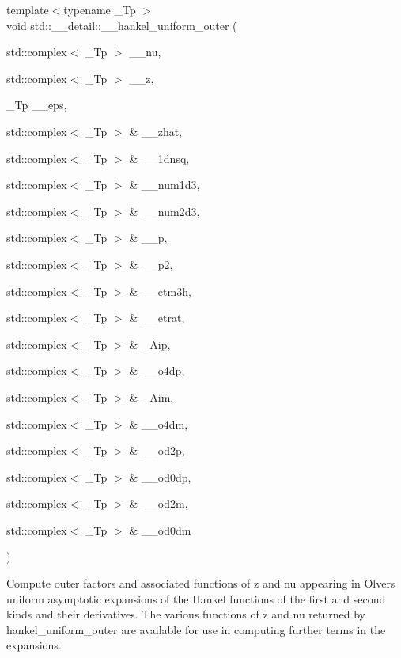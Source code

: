 {\footnotesize\ttfamily template$<$typename \+\_\+\+Tp $>$ \\
void std\+::\+\_\+\+\_\+detail\+::\+\_\+\+\_\+hankel\+\_\+uniform\+\_\+outer (\begin{DoxyParamCaption}\item[{std\+::complex$<$ \+\_\+\+Tp $>$}]{\+\_\+\+\_\+nu,  }\item[{std\+::complex$<$ \+\_\+\+Tp $>$}]{\+\_\+\+\_\+z,  }\item[{\+\_\+\+Tp}]{\+\_\+\+\_\+eps,  }\item[{std\+::complex$<$ \+\_\+\+Tp $>$ \&}]{\+\_\+\+\_\+zhat,  }\item[{std\+::complex$<$ \+\_\+\+Tp $>$ \&}]{\+\_\+\+\_\+1dnsq,  }\item[{std\+::complex$<$ \+\_\+\+Tp $>$ \&}]{\+\_\+\+\_\+num1d3,  }\item[{std\+::complex$<$ \+\_\+\+Tp $>$ \&}]{\+\_\+\+\_\+num2d3,  }\item[{std\+::complex$<$ \+\_\+\+Tp $>$ \&}]{\+\_\+\+\_\+p,  }\item[{std\+::complex$<$ \+\_\+\+Tp $>$ \&}]{\+\_\+\+\_\+p2,  }\item[{std\+::complex$<$ \+\_\+\+Tp $>$ \&}]{\+\_\+\+\_\+etm3h,  }\item[{std\+::complex$<$ \+\_\+\+Tp $>$ \&}]{\+\_\+\+\_\+etrat,  }\item[{std\+::complex$<$ \+\_\+\+Tp $>$ \&}]{\+\_\+\+Aip,  }\item[{std\+::complex$<$ \+\_\+\+Tp $>$ \&}]{\+\_\+\+\_\+o4dp,  }\item[{std\+::complex$<$ \+\_\+\+Tp $>$ \&}]{\+\_\+\+Aim,  }\item[{std\+::complex$<$ \+\_\+\+Tp $>$ \&}]{\+\_\+\+\_\+o4dm,  }\item[{std\+::complex$<$ \+\_\+\+Tp $>$ \&}]{\+\_\+\+\_\+od2p,  }\item[{std\+::complex$<$ \+\_\+\+Tp $>$ \&}]{\+\_\+\+\_\+od0dp,  }\item[{std\+::complex$<$ \+\_\+\+Tp $>$ \&}]{\+\_\+\+\_\+od2m,  }\item[{std\+::complex$<$ \+\_\+\+Tp $>$ \&}]{\+\_\+\+\_\+od0dm }\end{DoxyParamCaption})}



Compute outer factors and associated functions of {\ttfamily z} and {\ttfamily nu} appearing in Olver\textquotesingle{}s uniform asymptotic expansions of the Hankel functions of the first and second kinds and their derivatives. The various functions of z and nu returned by {\ttfamily hankel\+\_\+uniform\+\_\+outer} are available for use in computing further terms in the expansions. 



